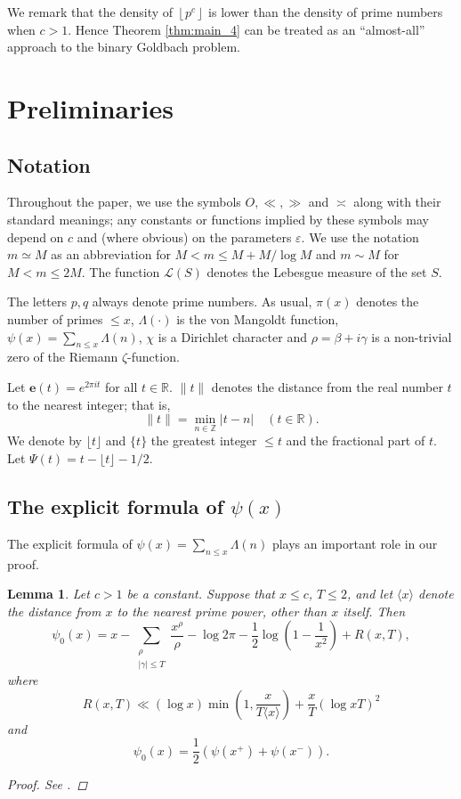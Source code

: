 \documentclass[12pt, reqno, twoside, letterpaper]{amsart}
\numberwithin{equation}{section}
\def\fl#1{\left\lfloor#1\right\rfloor}
\newcommand{\e}{\ensuremath{\mathbf{e}}}
\newcommand{\RR}{\ensuremath{\mathbb{R}}}
\newcommand{\ZZ}{\ensuremath{\mathbb{Z}}}
\theoremstyle{customthm}
\newtheorem{lemma}[X]{Lemma}
\theoremstyle{customrem}
\begin{document}
We remark that the density of $\fl{p^c}$ is lower than the density of prime numbers when $c > 1$. Hence Theorem \ref{thm:main_4} can be treated as an “almost-all” approach to the binary Goldbach problem.  

\section{Preliminaries}
\subsection{Notation}
Throughout the paper, we use the symbols $O,\ll,\gg$ and $\asymp$ along with their standard meanings; any constants or functions implied by these symbols may depend on $c$ and (where obvious) on the parameters $\varepsilon$. We use the notation $m \simeq M$ as an abbreviation for $M < m \leqslant M+ M/\log M$  and $m\sim M$ for $M<m\leqslant 2M$. The function $\mathcal{L}(S)$ denotes the Lebesgue measure of the set $S$.\par
The letters $p,q$ always denote prime numbers. As usual, $\pi(x)$ denotes the number of primes $\leqslant x$, $\Lambda(\cdot)$ is the von Mangoldt function, $\psi(x)=\sum_{n\leqslant x}\Lambda(n)$, $\chi$ is a Dirichlet character and $\rho =\beta +i\gamma$ is a non-trivial zero of the Riemann $\zeta$-function. \par
Let $\e(t)= e^{2\pi it}$ for all $t\in\RR$. $\|t\|$ denotes the distance from the real number $t$ to the nearest integer; that is,
$$
\|t\|=\min_{n\in \ZZ}|t-n|\quad (t\in \RR).
$$
We denote by $\lfloor t\rfloor$ and $\{t\}$ the greatest integer $\leqslant t$ and the fractional part of $t$. Let $\Psi(t)=t-\lfloor t\rfloor- 1/2$.
\subsection{The explicit formula of $\psi(x)$}
The explicit formula of $\psi(x) = \sum_{n \leqslant x} \Lambda(n)$ plays an important role in our proof.  
\begin{lemma}
	\label{lemma:explicit-formula}
	Let $c>1$ be a constant. Suppose that $x\leqslant c$, $T\leqslant 2$, and let $\langle x\rangle$ denote the distance from $x$ to the nearest prime power, other than $x$ itself. Then
	\begin{equation}
	\label{eq:psi0}
	\psi_0(x)=x-\sum_{\substack{\rho \\ |\gamma|\leqslant T}}\frac{x^\rho}{\rho}-\log 2\pi-\frac{1}{2}\log(1-\frac{1}{x^2})+R(x,T),
	\end{equation}
	where
	$$
	R(x,T)\ll (\log x)\min(1,\frac{x}{T\langle x\rangle})+\frac{x}{T}(\log xT)^2
	$$
	and
	$$
	\psi_0(x)=\frac{1}{2}(\psi(x^+)+\psi(x^-)).
	$$
\begin{proof}
See \cite[Theorem~12.5]{Montgomery}.
\end{proof}
\end{lemma}
\end{document}
